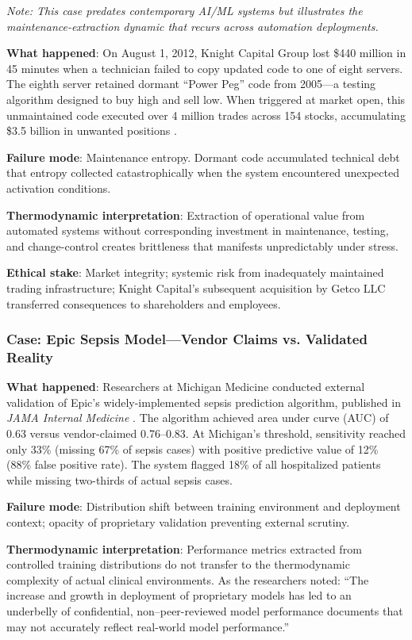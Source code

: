 \textit{Note: This case predates contemporary AI/ML systems but illustrates the maintenance-extraction dynamic that recurs across automation deployments.}

\textbf{What happened}: On August 1, 2012, Knight Capital Group lost \$440 million in 45 minutes when a technician failed to copy updated code to one of eight servers. The eighth server retained dormant ``Power Peg'' code from 2005---a testing algorithm designed to buy high and sell low. When triggered at market open, this unmaintained code executed over 4 million trades across 154 stocks, accumulating \$3.5 billion in unwanted positions \citep{sec2013knight, nytimes2012knight}.

\textbf{Failure mode}: Maintenance entropy. Dormant code accumulated technical debt that entropy collected catastrophically when the system encountered unexpected activation conditions.

\textbf{Thermodynamic interpretation}: Extraction of operational value from automated systems without corresponding investment in maintenance, testing, and change-control creates brittleness that manifests unpredictably under stress.

\textbf{Ethical stake}: Market integrity; systemic risk from inadequately maintained trading infrastructure; Knight Capital's subsequent acquisition by Getco LLC transferred consequences to shareholders and employees.

\subsubsection{Case: Epic Sepsis Model---Vendor Claims vs. Validated Reality}

\textbf{What happened}: Researchers at Michigan Medicine conducted external validation of Epic's widely-implemented sepsis prediction algorithm, published in \textit{JAMA Internal Medicine} \citep{wong2021sepsis}. The algorithm achieved area under curve (AUC) of 0.63 versus vendor-claimed 0.76--0.83. At Michigan's threshold, sensitivity reached only 33\% (missing 67\% of sepsis cases) with positive predictive value of 12\% (88\% false positive rate). The system flagged 18\% of all hospitalized patients while missing two-thirds of actual sepsis cases.

\textbf{Failure mode}: Distribution shift between training environment and deployment context; opacity of proprietary validation preventing external scrutiny.

\textbf{Thermodynamic interpretation}: Performance metrics extracted from controlled training distributions do not transfer to the thermodynamic complexity of actual clinical environments. As the researchers noted: ``The increase and growth in deployment of proprietary models has led to an underbelly of confidential, non--peer-reviewed model performance documents that may not accurately reflect real-world model performance.''

